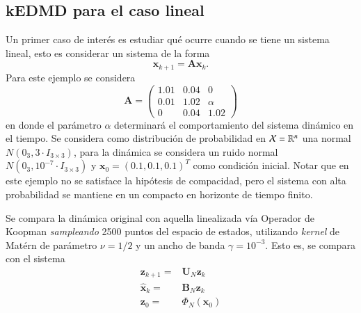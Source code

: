 \subsection{kEDMD para el caso lineal}

Un primer caso de interés es estudiar qué ocurre cuando se tiene un sistema lineal, esto es considerar un sistema de la forma
\begin{equation*}
    \mathbf{x}_{k+1} = \mathbf{A} \mathbf{x}_{k}.
\end{equation*}
Para este ejemplo se considera
\begin{equation*}
    \mathbf{A} = 
    \begin{pmatrix}
        1.01 & 0.04 & 0 \\
        0.01 & 1.02 & \alpha \\
        0 & 0.04 & 1.02
    \end{pmatrix}
\end{equation*}
en donde el parámetro $\alpha$ determinará el comportamiento del sistema dinámico en el tiempo. Se considera como distribución de probabilidad en $\mathcal{X} = \mathbb{R}^n$ una normal $N(0_{3}, 3 \cdot I_{3\times3})$, para la dinámica se considera un ruido normal $N(0_{3}, 10^{-7} \cdot I_{3\times3})$ y $\mathbf{x}_0 = (0.1, 0.1, 0.1)^T$ como condición inicial. Notar que en este ejemplo no se satisface la hipótesis de compacidad, pero el sistema con alta probabilidad se mantiene en un compacto en horizonte de tiempo finito.

Se compara la dinámica original con aquella linealizada vía Operador de Koopman \textit{sampleando} 2500 puntos del espacio de estados, utilizando \textit{kernel} de Matérn de parámetro $\nu = 1/2$ y un ancho de banda $\gamma = 10^{-3}$. Esto es, se compara con el sistema
\begin{align*}
    \mathbf{z}_{k+1} = & \mathbf{U}_N \mathbf{z}_k \\
    \hat{\mathbf{x}}_k = & \mathbf{B}_N \mathbf{z}_k \\
    \mathbf{z}_0 = & \Phi_N(\mathbf{x}_0)
\end{align*}


